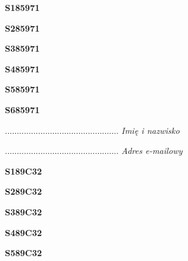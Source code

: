 \begin{turn}{90}\huge \textbf{S185971}\end{turn}

\begin{turn}{90}\huge \textbf{S285971}\end{turn}

\begin{turn}{90}\huge \textbf{S385971}\end{turn}

\begin{turn}{90}\huge \textbf{S485971}\end{turn}

\begin{turn}{90}\huge \textbf{S585971}\end{turn}

\begin{turn}{90}\huge \textbf{S685971}\end{turn}

\begin{turn}{90}\begin{minipage}{\linewidth} \vspace{20mm} ................................................  \textit{Imię i nazwisko}\end{minipage}\end{turn}

\begin{turn}{90}\begin{minipage}{\linewidth} \vspace{20mm} ................................................  \textit{Adres e-mailowy}\end{minipage}\end{turn}

\begin{turn}{90}\huge \textbf{S189C32}\end{turn}

\begin{turn}{90}\huge \textbf{S289C32}\end{turn}

\begin{turn}{90}\huge \textbf{S389C32}\end{turn}

\begin{turn}{90}\huge \textbf{S489C32}\end{turn}

\begin{turn}{90}\huge \textbf{S589C32}\end{turn}

